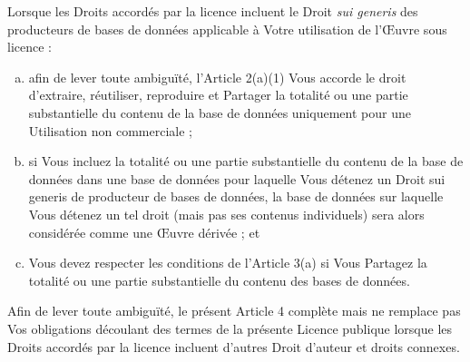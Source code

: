 
Lorsque les Droits accordés par la licence incluent le Droit \textit{sui generis} des producteurs de bases de données applicable à Votre utilisation de l’Œuvre sous licence :

\begin{enumerate}[a.]
\item afin de lever toute ambiguïté, l’Article 2(a)(1) Vous accorde le droit d’extraire, réutiliser, reproduire et Partager la totalité ou une partie substantielle du contenu de la base de données uniquement pour une Utilisation non commerciale ;
\item si Vous incluez la totalité ou une partie substantielle du contenu de la base de données dans une base de données pour laquelle Vous détenez un Droit sui generis de producteur de bases de données, la base de données sur laquelle Vous détenez un tel droit (mais pas ses contenus individuels) sera alors considérée comme une Œuvre dérivée ; et
\item Vous devez respecter les conditions de l’Article 3(a) si Vous Partagez la totalité ou une partie substantielle du contenu des bases de données.
\end{enumerate}

Afin de lever toute ambiguïté, le présent Article 4 complète mais ne remplace pas Vos obligations découlant des termes de la présente Licence publique lorsque les Droits accordés par la licence incluent d’autres Droit d’auteur et droits connexes. 



